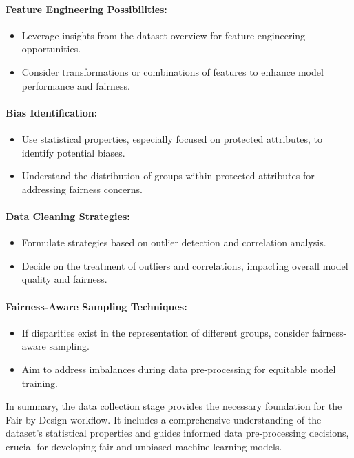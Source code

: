 \paragraph{Feature Engineering Possibilities:}
\begin{itemize}
    \item Leverage insights from the dataset overview for feature engineering opportunities.
    \item Consider transformations or combinations of features to enhance model performance and fairness.
\end{itemize}

\paragraph{Bias Identification:}
\begin{itemize}
    \item Use statistical properties, especially focused on protected attributes, to identify potential biases.
    \item Understand the distribution of groups within protected attributes for addressing fairness concerns.
\end{itemize}

\paragraph{Data Cleaning Strategies:}
\begin{itemize}
    \item Formulate strategies based on outlier detection and correlation analysis.
    \item Decide on the treatment of outliers and correlations, impacting overall model quality and fairness.
\end{itemize}

\paragraph{Fairness-Aware Sampling Techniques:}
\begin{itemize}
    \item If disparities exist in the representation of different groups, consider fairness-aware sampling.
    \item Aim to address imbalances during data pre-processing for equitable model training.
\end{itemize}

In summary, the data collection stage provides the necessary foundation for the Fair-by-Design workflow. It includes a comprehensive understanding of the dataset's statistical properties and guides informed data pre-processing decisions, crucial for developing fair and unbiased machine learning models.

